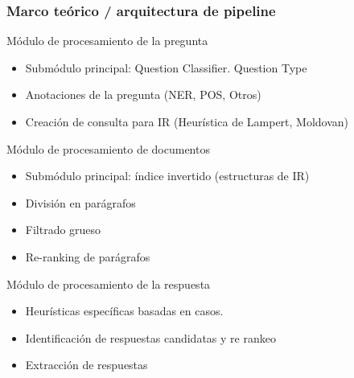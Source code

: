 \fontsize{8.5pt}{7.2}\selectfont
\begin{frame}[<+->]
\frametitle{Marco teórico / arquitectura de pipeline}
  \begin{block}{Módulo de procesamiento de la pregunta}
    \begin{itemize}
      \item Submódulo principal: Question Classifier. Question Type
      \item Anotaciones de la pregunta (NER, POS, Otros)
      \item Creación de consulta para IR (Heurística de Lampert, Moldovan)
    \end{itemize}
  \end{block}
  \begin{alertblock}{Módulo de procesamiento de documentos}
    \begin{itemize}
      \item Submódulo principal: índice invertido (estructuras de IR)
      \item División en parágrafos
      \item Filtrado grueso
      \item Re-ranking de parágrafos
    \end{itemize}
  \end{alertblock}
  
  \begin{exampleblock}{Módulo de procesamiento de la respuesta}
    \begin{itemize}
      \item Heurísticas específicas basadas en casos.
      \item Identificación de respuestas candidatas y re rankeo
      \item Extracción de respuestas
    \end{itemize}
  \end{exampleblock}

\end{frame}





